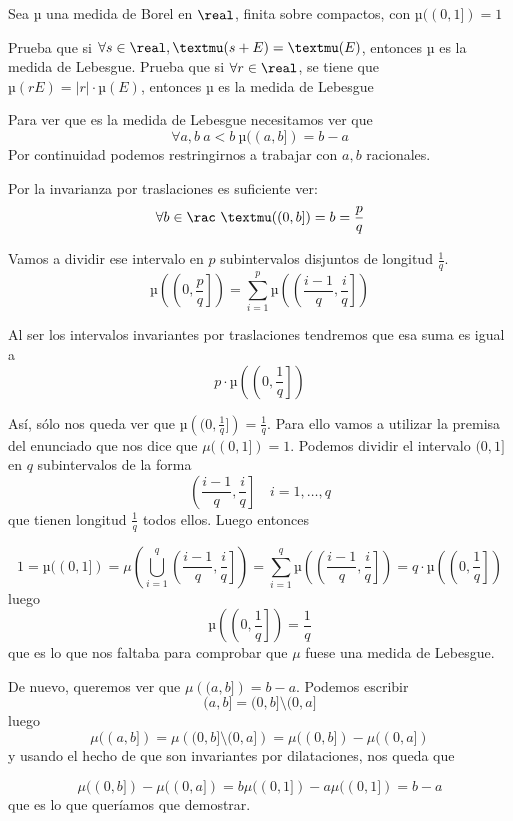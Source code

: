 \begin{problem}
Sea µ una medida de Borel en $\real$, finita sobre compactos, con $µ((0, 1])=1$

\ppart Prueba que si $\forall s \in \real, µ(s + E)=µ(E)$, entonces µ es la medida de Lebesgue.
\ppart Prueba que si $\forall r \in \real$, se tiene que $µ(rE)=|r|·µ(E)$, entonces µ es la medida de Lebesgue
\solution

\spart
Para ver que es la medida de Lebesgue necesitamos ver que
\[\forall a,b \ a<b \ µ((a,b]) = b-a\]
Por continuidad podemos restringirnos a trabajar con $a,b$ racionales.

Por la invarianza por traslaciones es suficiente ver:
\[\forall b \in \rac \ µ((0,b])=b = \frac{p}{q}\]

Vamos a dividir ese intervalo en $p$ subintervalos disjuntos de longitud $\frac{1}{q}$.
\[µ\left(\left(0, \frac{p}{q}\right]\right) = \sum_{i=1}^{p} µ\left(\left(\frac{i-1}{q}, \frac{i}{q}\right]\right) \]

Al ser los intervalos invariantes por traslaciones tendremos que esa suma es igual a \[ p\cdot µ\left(\left(0, \frac{1}{q}\right]\right)\]

Así, sólo nos queda ver que $µ\left((0, \frac{1}{q}]\right) = \frac{1}{q}$. Para ello vamos a utilizar la premisa del enunciado que nos dice que $μ((0,1]) = 1$. Podemos dividir el intervalo $(0,1]$ en $q$ subintervalos de la forma \[ \left(\frac{i-1}{q}, \frac{i}{q}\right]\quad i = 1,\dotsc, q \] que tienen longitud $\frac{1}{q}$ todos ellos. Luego entonces

\[ 1 = µ((0, 1]) = μ\left(\bigcup_{i=1}^q \left(\frac{i-1}{q}, \frac{i}{q}\right] \right)= \sum_{i=1}^{q} µ\left(\left(\frac{i-1}{q}, \frac{i}{q}\right]\right) = q \cdot µ\left(\left(0, \frac{1}{q}\right]\right)\] luego \[ µ\left(\left(0, \frac{1}{q}\right]\right) = \frac{1}{q} \] que es lo que nos faltaba para comprobar que $μ$ fuese una medida de Lebesgue.

\spart De nuevo, queremos ver que $μ\left((a,b]\right) = b - a$. Podemos escribir \[ (a, b] = (0, b] \setminus (0,a] \] luego \[ μ((a,b]) = μ\left((0,b] \setminus (0, a]\right) = μ((0,b]) - μ((0,a])\] y usando el hecho de que son invariantes por dilataciones, nos queda que

\[ μ((0,b]) - μ((0,a]) = bμ((0,1]) - aμ((0,1]) = b - a \] que es lo que queríamos que demostrar.

\end{problem}

